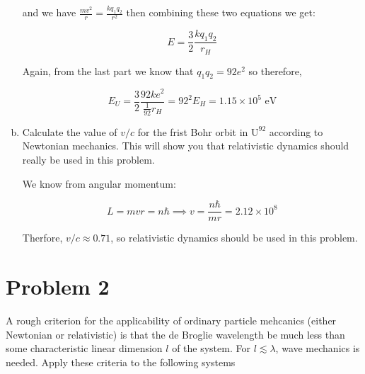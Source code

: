 \documentclass[10pt]{article}
\begin{document}
\begin{enumerate}[(a)]
\begin{solution}
            and we have $\frac{mv^2}{r} = \frac{kq_1q_2}{r^2}$ then combining these two equations we get: 

            \[ E = \frac{3}{2} \frac{kq_1q_2}{r_H}\]

            Again, from the last part we know that $q_1q_2 = 92e^2$ so therefore, 

            \[ E_U = \frac 32 \frac{92 ke^2}{\frac{1}{92}r_H} = 92^2 E_H = 1.15 \times 10^5 \text{ eV}\]


        \end{solution}
        \item Calculate the value of $v/c$ for the frist Bohr orbit in $\text{U}^{92}$ according to Newtonian mechanics. This will show you that relativistic dynamics should really be used in this problem.
        
        \begin{solution}
            We know from angular momentum:

            \[ L = mvr = n\hbar \implies v = \frac{n\hbar}{mr} = 2.12 \times 10^8\] 

            Therfore, $v/c \approx 0.71$, so relativistic dynamics should be used in this problem.
        \end{solution}
    \end{enumerate}


    \pagebreak
    \section*{Problem 2}

    A rough criterion for the applicability of ordinary particle mehcanics (either Newtonian or relativistic) is that the de Broglie wavelength be much less than some characteristic linear dimension $l$ of the system. For $l \lesssim \lambda$, wave mechanics is needed. Apply these criteria to the following systems
\end{document}
